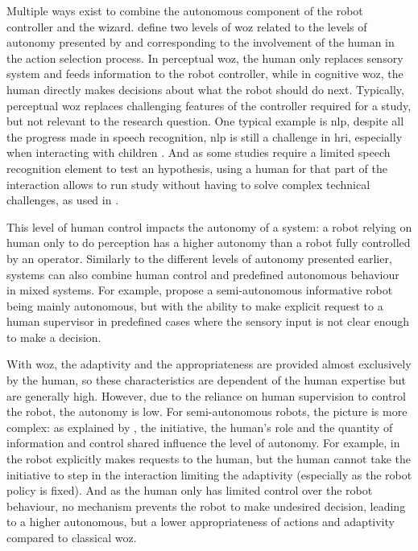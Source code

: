 	Multiple ways exist to combine the autonomous component of the robot controller and the wizard. \cite{baxter2016characterising} define two levels of \gls{woz} related to the levels of autonomy presented by \cite{beer2014toward} and corresponding to the involvement of the human in the action selection process. In perceptual \gls{woz}, the human only replaces sensory system and feeds information to the robot controller, while in cognitive \gls{woz}, the human directly makes decisions about what the robot should do next. Typically, perceptual \gls{woz} replaces challenging features of the controller required for a study, but not relevant to the research question. One typical example is \gls{nlp}, despite all the progress made in speech recognition, \gls{nlp} is still a challenge in \gls{hri}, especially when interacting with children \citep{kennedy2017child}. And as some studies require a limited speech recognition element to test an hypothesis, using a human for that part of the interaction allows to run study without having to solve complex technical challenges, as used in \cite{cakmak2010designing}.

	This level of human control impacts the autonomy of a system: a robot relying on human only to do perception has a higher autonomy than a robot fully controlled by an operator. Similarly to the different levels of autonomy presented earlier, systems can also combine human control and predefined autonomous behaviour in mixed systems. For example, \citet{shiomi2008semi} propose a semi-autonomous informative robot being mainly autonomous, but with the ability to make explicit request to a human supervisor in predefined cases where the sensory input is not clear enough to make a decision. %
	
	With \gls{woz}, the adaptivity and the appropriateness are provided almost exclusively by the human, so these characteristics are dependent of the human expertise but are generally high. However, due to the reliance on human supervision to control the robot, the autonomy is low. For semi-autonomous robots, the picture is more complex: as explained by \cite{beer2014toward}, the initiative, the human's role and the quantity of information and control shared influence the level of autonomy. For example, in \citet{shiomi2008semi} the robot explicitly makes requests to the human, but the human cannot take the initiative to step in the interaction limiting the adaptivity (especially as the robot policy is fixed). And as the human only has limited control over the robot behaviour, no mechanism prevents the robot to make undesired decision, leading to a higher autonomous, but a lower appropriateness of actions and adaptivity compared to classical \gls{woz}.


